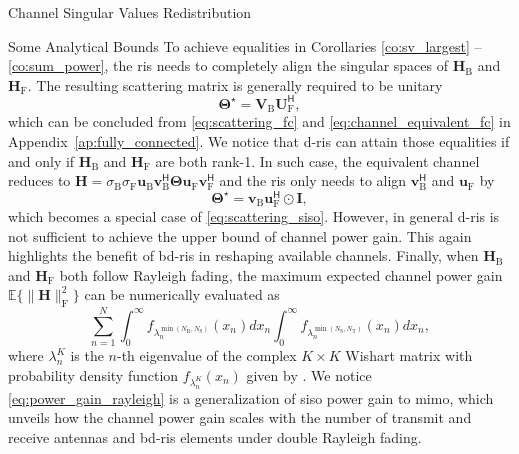 \documentclass[journal]{IEEEtran}
\begin{document}
\begin{section}{Channel Singular Values Redistribution}
\begin{subsection}{Some Analytical Bounds}
		To achieve equalities in Corollaries \ref{co:sv_largest} -- \ref{co:sum_power}, the \gls{ris} needs to completely align the singular spaces of $\mathbf{H}_\mathrm{B}$ and $\mathbf{H}_\mathrm{F}$.
		The resulting scattering matrix is generally required to be unitary
		\begin{equation}
			\mathbf{\Theta}^\star = \mathbf{V}_\mathrm{B} \mathbf{U}_\mathrm{F}^\mathsf{H},
			\label{eq:scattering_fc_optimal}
		\end{equation}
		which can be concluded from \eqref{eq:scattering_fc} and \eqref{eq:channel_equivalent_fc} in Appendix~\ref{ap:fully_connected}.
		We notice that \gls{d}-\gls{ris} can attain those equalities if and only if $\mathbf{H}_\mathrm{B}$ and $\mathbf{H}_\mathrm{F}$ are both rank-1.
		In such case, the equivalent channel reduces to $\mathbf{H} = \sigma_\mathrm{B} \sigma_\mathrm{F} \mathbf{u}_\mathrm{B} \mathbf{v}_\mathrm{B}^\mathsf{H} \mathbf{\Theta} \mathbf{u}_\mathrm{F} \mathbf{v}_\mathrm{F}^\mathsf{H}$ and the \gls{ris} only needs to align $\mathbf{v}_\mathrm{B}^\mathsf{H}$ and $\mathbf{u}_\mathrm{F}$ by
		\begin{equation}
			\mathbf{\Theta}^\star = \mathbf{v}_\mathrm{B} \mathbf{u}_\mathrm{F}^\mathsf{H} \odot \mathbf{I},
		\end{equation}
		which becomes a special case of \eqref{eq:scattering_siso}.
		However, in general \gls{d}-\gls{ris} is not sufficient to achieve the upper bound of channel power gain.
		This again highlights the benefit of \gls{bd}-\gls{ris} in reshaping available channels.
		Finally, when $\mathbf{H}_\mathrm{B}$ and $\mathbf{H}_\mathrm{F}$ both follow Rayleigh fading, the maximum expected channel power gain $\mathbb{E}\bigl\{ \lVert \mathbf{H} \rVert _ \mathrm{F}^2 \bigr\}$ can be numerically evaluated as
		\begin{equation}
			\sum_{n=1}^N \int_0^\infty f_{\lambda_n^{\min(N_\mathrm{R},N_\mathrm{S})}}(x_n) d x_n \int_0^\infty f_{\lambda_n^{\min(N_\mathrm{S},N_\mathrm{T})}}(x_n) d x_n,
			\label{eq:power_gain_rayleigh}
		\end{equation}
		where $\lambda_n^{K}$ is the $n$-th eigenvalue of the complex $K \times K$ Wishart matrix with probability density function $f_{\lambda_n^{K}}(x_n)$ given by \cite[Equation 51]{Zanella2009}.
		We notice \eqref{eq:power_gain_rayleigh} is a generalization of \gls{siso} power gain \cite[Equation 58]{Shen2020a} to \gls{mimo}, which unveils how the channel power gain scales with the number of transmit and receive antennas and \gls{bd}-\gls{ris} elements under double Rayleigh fading.


\end{subsection}
\end{section}
\end{document}
